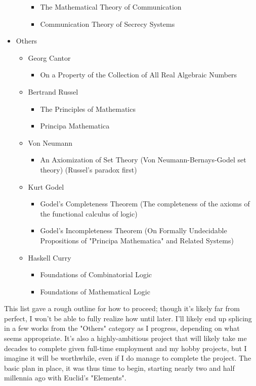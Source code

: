 \documentclass{article}
\begin{document}
\begin{itemize}
\begin{itemize}
\begin{itemize}
			\item The Mathematical Theory of Communication
			\item Communication Theory of Secrecy Systems
		\end{itemize}
	\end{itemize}
	\item Others
	\begin{itemize}
		\item Georg Cantor
		\begin{itemize}
			\item On a Property of the Collection of All Real Algebraic Numbers
		\end{itemize}
		\item Bertrand Russel
		\begin{itemize}
			\item The Principles of Mathematics
			\item Principa Mathematica
		\end{itemize}
		\item Von Neumann
		\begin{itemize}
			\item An Axiomization of Set Theory (Von Neumann-Bernays-Godel set theory) (Russel's paradox first)
		\end{itemize}
		\item Kurt Godel
		\begin{itemize}
			\item Godel's Completeness Theorem (The completeness of the axioms of the functional calculus of logic)
			\item Godel's Incompleteness Theorem (On Formally Undecidable Propositions of "Principa Mathematica" and Related Systems)
		\end{itemize}
		\item Haskell Curry
		\begin{itemize}
			\item Foundations of Combinatorial Logic
			\item Foundations of Mathematical Logic
		\end{itemize}
	\end{itemize}
\end{itemize}
This list gave a rough outline for how to proceed; though it's likely far from perfect, I won't be able to fully realize how until later.  I'll likely end up splicing in a few works from the "Others" category as I progress, depending on what seems appropriate.  It's also a highly-ambitious project that will likely take me decades to complete given full-time employment and my hobby projects, but I imagine it will be worthwhile, even if I do manage to complete the project.  The basic plan in place, it was thus time to begin, starting nearly two and half millennia ago with Euclid's "Elements".
\end{document}
